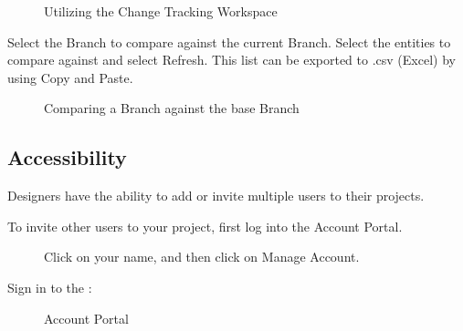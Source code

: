\documentclass[letterpaper,10pt,english]{sphinxmanual}
\begin{document}
\begin{figure}[H]
\centering
\capstart

\noindent{}
\caption{Utilizing the Change Tracking Workspace}\label{\detokenize{docs/userguide/projectmanagement/changetracking/index-change_tracking:id2}}\end{figure}

Select the Branch to compare against the current Branch.  Select the entities to compare against and select Refresh.  This list can be exported to .csv (Excel) by using Copy and Paste.

\begin{figure}[H]
\centering
\capstart

\noindent{}
\caption{Comparing a Branch against the base Branch}\label{\detokenize{docs/userguide/projectmanagement/changetracking/index-change_tracking:id3}}\end{figure}


\subsection{Accessibility}
\label{\detokenize{docs/userguide/projectmanagement/accessibility/index-accessibility:accessibility}}\label{\detokenize{docs/userguide/projectmanagement/accessibility/index-accessibility:id1}}\label{\detokenize{docs/userguide/projectmanagement/accessibility/index-accessibility::doc}}
Designers have the ability to add or invite multiple users to their projects.

To invite other users to your project, first log into the Account Portal.

\begin{figure}[H]
\centering
\capstart

\noindent{}
\caption{Click on your name, and then click on Manage Account.}\label{\detokenize{docs/userguide/projectmanagement/accessibility/index-accessibility:id2}}\end{figure}

Sign in to the :

\begin{figure}[H]
\centering
\capstart

\noindent{}
\caption{Account Portal}\label{\detokenize{docs/userguide/projectmanagement/accessibility/index-accessibility:id3}}\end{figure}
\end{document}

